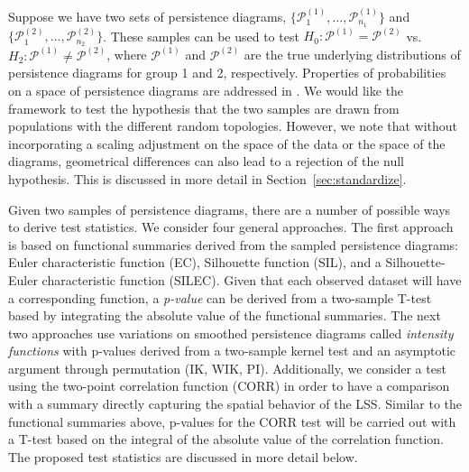 \documentclass[12pt]{article}
\begin{document}
\begin{sloppypar}
Suppose we have two sets of persistence diagrams, $\{\mathcal P_1^{(1)}, \ldots, \mathcal P_{n_1}^{(1)}\}$ and $\{\mathcal P_1^{(2)}, \ldots, \mathcal P_{n_2}^{(2)}\}$.  These samples can be used to test $H_0: \mathcal
P^{(1)} = \mathcal P^{(2)}$ vs. $H_2: \mathcal P^{(1)} \neq \mathcal P^{(2)}$, where $\mathcal P^{(1)}$ and $\mathcal P^{(2)}$ are the true underlying
distributions of persistence diagrams for group 1 and 2, respectively.  Properties of probabilities on a space of persistence diagrams are addressed in \citep{Mileyko:2011aa}.
We would like the framework to test the hypothesis that the two samples are drawn from populations with the different random topologies. However, we note that without incorporating a scaling adjustment on the space of the data or the space of the diagrams, geometrical differences can also lead to a rejection of the null hypothesis. This is discussed in more detail in Section~\ref{sec:standardize}.
\end{sloppypar}

Given two samples of persistence diagrams, there are a number of possible ways to derive test statistics. We consider four general approaches. The first approach is based on functional summaries derived from the sampled persistence diagrams: Euler characteristic function (EC), Silhouette function (SIL), and a
Silhouette-Euler characteristic function (SILEC). Given that each observed dataset will have a corresponding function, a \emph{p-value} can be derived from a two-sample T-test based by integrating the absolute value of the functional summaries. The next two approaches use variations on smoothed persistence diagrams called \emph{intensity functions} \citep{chen2015statistical} with p-values derived from a two-sample kernel test \citep{gretton2012kernel} and an asymptotic argument through permutation (IK, WIK, PI). Additionally, we consider a test using the two-point correlation function (CORR) in order to have a comparison with a summary directly capturing the spatial behavior of the LSS. Similar to the functional summaries above, p-values for the CORR test will be carried out with a T-test based on the integral of the absolute value of the correlation function. The proposed test statistics are discussed in more detail below.

\end{document}
